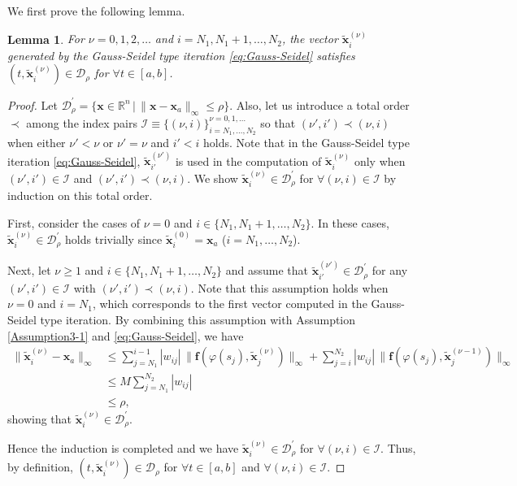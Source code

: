 \documentclass[pdflatex,sn-mathphys-num]{sn-jnl}%
\theoremstyle{thmstyleone}%
\theoremstyle{thmstyletwo}%
\newtheorem{lemma}{Lemma}%
\theoremstyle{thmstylethree}%
\begin{document}
We first prove the following lemma.
\begin{lemma}
\label{Lem3-2}
For $\nu=0, 1, 2, \ldots$ and $i=N_1, N_1+1, \ldots, N_2$, the vector $\tilde{\bm x}_i^{(\nu)}$ generated by the Gauss-Seidel type iteration \eqref{eq:Gauss-Seidel} satisfies $(t,\tilde{\bm x}_i^{(\nu)})\in\mathcal{D}_{\rho}$ for $\forall t\in[a,b]$.
\end{lemma}
\begin{proof}
Let $\mathcal{D}_{\rho}^{\prime}=\{{\bm x}\in\mathbb{R}^n\,|\,\|{\bm x}-{\bm x}_a\|_{\infty}\le\rho \}$. Also, let us introduce a total order $\prec$ among the index pairs $\mathcal{I}\equiv\{(\nu,i)\}_{i=N_1,\ldots,N_2}^{\nu=0,1,\ldots}$ so that $(\nu',i')\prec(\nu,i)$ when either $\nu'<\nu$ or $\nu'=\nu$ and $i'<i$ holds. Note that in the Gauss-Seidel type iteration \eqref{eq:Gauss-Seidel}, $\tilde{\bm x}_{i'}^{(\nu')} $ is used in the computation of $\tilde{\bm x}_i^{(\nu)}$ only when $(\nu',i')\in\mathcal{I}$ and $(\nu',i')\prec(\nu,i)$. We show $\tilde{\bm x}_i^{(\nu)}\in\mathcal{D}_{\rho}^{\prime}$ for $\forall(\nu,i)\in\mathcal{I}$ by induction on this total order. 

First, consider the cases of $\nu=0$ and $i\in\{N_1, N_1+1, \ldots, N_2\}$. In these cases, $\tilde{\bm x}_i^{(\nu)}\in\mathcal{D}_{\rho}^{\prime}$ holds trivially since $\tilde{\bm x}_i^{(0)}={\bm x}_a$ ($i=N_1,\ldots,N_2$).

Next, let $\nu\ge 1$ and $i\in\{N_1, N_1+1, \ldots, N_2\}$ and assume that $\tilde{\bm x}_{i'}^{(\nu')}\in\mathcal{D}_{\rho}^{\prime}$ for any $(\nu',i')\in\mathcal{I}$ with $(\nu',i')\prec(\nu,i)$. Note that this assumption holds when $\nu=0$ and $i=N_1$, which corresponds to the first vector computed in the Gauss-Seidel type iteration. By combining this assumption with Assumption \ref{Assumption3-1} and \eqref{eq:Gauss-Seidel}, we have
\begin{align}
\|\widetilde{\bm x}_i^{(\nu)}-{\bm x}_a\|_{\infty} &\le \sum_{j=N_1}^{i-1} |w_{ij}|\,\|{\bm f}(\varphi(s_j),\widetilde{\bm x}_j^{(\nu)})\|_{\infty} + \sum_{j=i}^{N_2} |w_{ij}|\,\|{\bm f}(\varphi(s_j),\widetilde{\bm x}_j^{(\nu-1)})\|_{\infty} \nonumber \\
&\le M\sum_{j=N_1}^{N_2}|w_{ij}| \nonumber \\
&\le \rho,
\end{align}
showing that $\tilde{\bm x}_i^{(\nu)} \in\mathcal{D}_{\rho}^{\prime}$.

Hence the induction is completed and we have $\tilde{\bm x}_i^{(\nu)} \in\mathcal{D}_{\rho}^{\prime}$ for $\forall(\nu,i)\in\mathcal{I}$. Thus, by definition, $(t,\tilde{\bm x}_i^{(\nu)})\in\mathcal{D}_{\rho}$ for $\forall t\in[a,b]$ and $\forall(\nu,i)\in\mathcal{I}$.
\end{proof}
\end{document}
